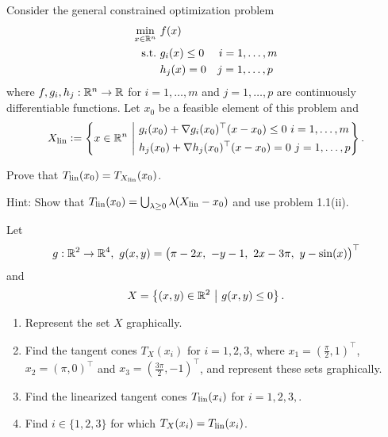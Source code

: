 \begin{problem}
    Consider the general constrained optimization problem
    \begin{align*}
        \min_{x \in \mathbb{R}^n} \ & f(x) \\
        \mathrm{s.t.} \ & g_i(x) \le 0 \quad \ i = 1, \dots, m \\
        & h_j(x) = 0 \quad j = 1, \dots, p
    \end{align*}
    where \(f, g_i, h_j : \mathbb{R}^n \to \mathbb{R}\) for \(i = 1, \dots, m\) and \(j = 1, \dots, p\) are continuously differentiable functions.
    Let \(x_0\) be a feasible element of this problem and
    \[X_{\operatorname{lin}} \mathrel{\mathop:}= \left\{ x \in \mathbb{R}^n \ \middle| \ \begin{aligned} & g_i(x_0) + \nabla g_i(x_0)^\top (x - x_0) \le 0 \ i = 1, \dots, m \\ & h_j(x_0) + \nabla h_j(x_0)^\top (x - x_0) = 0 \ j = 1, \dots, p \end{aligned} \right\}.\]

    Prove that \(T_{\operatorname{lin}}(x_0) = T_{X_{\operatorname{lin}}}(x_0)\).

    Hint: Show that \(T_{\operatorname{lin}}(x_0) = \bigcup_{\lambda \ge 0} \lambda (X_{\operatorname{lin}} - x_0)\) and use problem 1.1(ii).
\end{problem}

\begin{solution}
    
\end{solution}

\begin{problem}
    Let
    \[g : \mathbb{R}^2 \to \mathbb{R}^4 ,\ g(x,y) = \big(\pi-2x ,\ -y-1 ,\ 2x-3\pi ,\ y-\sin(x)\big)^\top\]
    and
    \[X = \left\{  (x,y) \in \mathbb{R}^2 \ \middle| \ g(x,y) \le 0 \right\}.\]

    \begin{enumerate}
        \item Represent the set \(X\) graphically.
        \item Find the tangent cones \(T_X(x_i)\) for \(i = 1, 2, 3\), where \(x_1 = (\frac{\pi}{2}, 1)^\top\), \(x_2 = (\pi, 0)^\top\) and \(x_3 = (\frac{3\pi}{2}, -1)^\top\), and represent these sets graphically.
        \item Find the linearized tangent cones \(T_{\operatorname{lin}}(x_i)\) for \(i = 1,2,3,\).
        \item Find \(i \in \{1,2,3\}\) for which \(T_X(x_i) = T_{\operatorname{lin}}(x_i)\).
    \end{enumerate}
\end{problem}

\begin{solution}
    
\end{solution}

